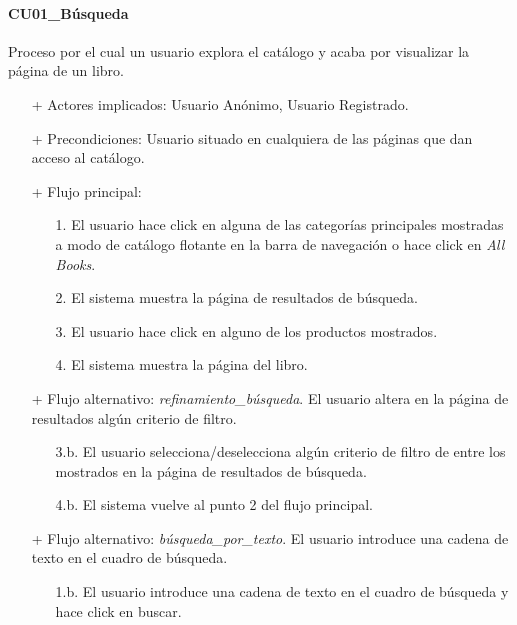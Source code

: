 \documentclass[a4paper,12pt,twoside,openright]{report}
\begin{document}
            \paragraph{CU01\_Búsqueda}
            Proceso por el cual un usuario explora el catálogo y acaba por visualizar la página de un libro.
            \begin{itemize}
                \item[+] Actores implicados: Usuario Anónimo, Usuario Registrado.
                \item[+] Precondiciones: Usuario situado en cualquiera de las páginas que dan acceso al catálogo.
                \item[+] Flujo principal:
                \begin{enumerate}
                    \item[1.] El usuario hace click en alguna de las categorías principales mostradas a modo de catálogo flotante en la barra de navegación
                    o hace click en \emph{All Books}.
                    \item[2.] El sistema muestra la página de resultados de búsqueda.
                    \item[3.] El usuario hace click en alguno de los productos mostrados.
                    \item[4.] El sistema muestra la página del libro.
                \end{enumerate}
                \item[+] Flujo alternativo: \emph{refinamiento\_búsqueda}. El usuario altera en la página de resultados algún criterio de filtro.
                \begin{itemize}
                    \item[3.b.] El usuario selecciona/deselecciona algún criterio de filtro de entre los mostrados en la página de resultados de búsqueda.
                    \item[4.b.] El sistema vuelve al punto 2 del flujo principal.
                \end{itemize}
                \item[+] Flujo alternativo: \emph{búsqueda\_por\_texto}. El usuario introduce una cadena de texto en el cuadro de búsqueda.
                \begin{itemize}
                    \item[1.b.] El usuario introduce una cadena de texto en el cuadro de búsqueda y hace click en buscar.
                \end{itemize}
            \end{itemize}
\end{document}
